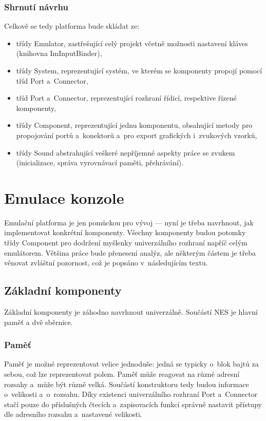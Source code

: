 \subsubsection{Shrnutí návrhu}
Celkově se tedy platforma bude skládat ze:
\begin{itemize}
	\item třídy Emulator, zastřešující celý projekt včetně možnosti nastavení kláves (knihovna ImInputBinder),
	\item třídy System, reprezentující systém, ve kterém se komponenty propojí pomocí tříd Port a~Connector,
	\item tříd Port a~Connector, reprezentující rozhraní řídicí, respektive řízené komponenty,
	\item třídy Component, reprezentující jednu komponentu, obsahující metody pro propojování portů a~konektorů a~pro export grafických i~zvukových vzorků,
	\item třídy Sound abstrahující veškeré nepříjemné aspekty práce se zvukem (inicializace, správa vyrovnávací paměti, přehrávání).
\end{itemize}

\section{Emulace konzole}
Emulační platforma je jen pomůckou pro vývoj --- nyní je třeba navrhnout, jak implementovat konkrétní komponenty. Všechny komponenty budou potomky třídy Component pro dodržení myšlenky univerzálního rozhraní napříč celým emulátorem. Většina práce bude přenesení analýz, ale některým částem je třeba věnovat zvláštní pozornost, což je popsáno v~následujícím textu.

\subsection{Základní komponenty}
Základní komponenty je záhodno navrhnout univerzálně. Součástí NES je hlavní paměť a dvě sběrnice.

\subsubsection{Paměť}
Paměť je možné reprezentovat velice jednoduše: jedná se typicky o~blok bajtů za sebou, což lze reprezentovat polem. Paměť může reagovat na různé adresní rozsahy a~může být různě velká. Součástí konstruktoru tedy budou informace o~velikosti a~o~rozsahu. Díky existenci univerzálního rozhraní Port a~Connector stačí pouze do příslušných čtecích a~zapisovacích funkcí správně nastavit přístupy dle adresního rozsahu a~nastavené velikosti.

